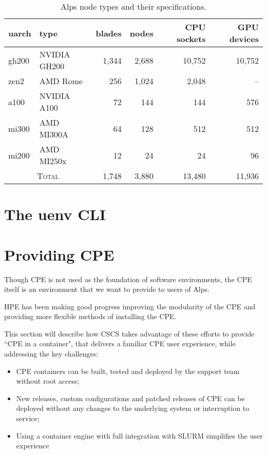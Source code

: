 \begin{table*}[h!]
\centering
\begin{tabular}{llrrrr}
\toprule
uarch   & type         & blades & nodes & CPU sockets & GPU devices \\
\midrule
gh200   & NVIDIA GH200 & 1,344   & 2,688  & 10,752      & 10,752      \\
zen2    & AMD Rome     & 256     & 1,024  & 2,048       & --          \\
a100    & NVIDIA A100  & 72      & 144    & 144         & 576         \\
mi300   & AMD MI300A   & 64      & 128    & 512         & 512         \\
mi200   & AMD MI250x   & 12      & 24     & 24          & 96          \\
\midrule
\multicolumn{2}{c}{\textsc{Total}}      & 1,748   & 3,880  & 13,480  & 11,936 \\
\bottomrule
\end{tabular}
\caption{Alps node types and their specifications.}
\label{tab:alps-nodes}
\end{table*}

\section{The uenv CLI}

\section{Providing CPE}
\label{sec:cpe}

Though CPE is not used as the foundation of software environments, the CPE itself is an environment that we want to provide to users of Alps.

HPE has been making good progress improving the modularity of the CPE and providing more flexible methods of installing the CPE.

This section will describe how CSCS takes advantage of these efforts to provide ``CPE in a container", that delivers a familiar CPE user experience, while addressing the key challenges:

\begin{itemize}
\item CPE containers can be built, tested and deployed by the support team without root access;
\item New releases, custom configurations and patched releases of CPE can be deployed without any changes to the underlying system or interruption to service;
\item Using a container engine with full integration with SLURM simplifies the user experience
\end{itemize}

